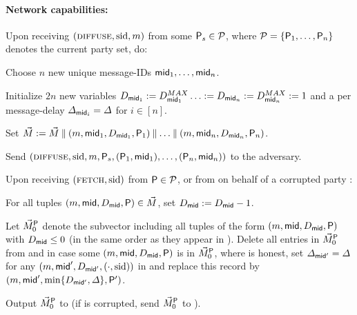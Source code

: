 \begin{cccFunctionality}
      \paragraph{Network capabilities:}
      \begin{cccItemize}[nosep]
            \item Upon receiving $(\textsc{diffuse}, \mathrm{sid}, m)$ from some
            $\mathsf{P}_s \in \mathcal{P}$, where $\mathcal{P} = \{ \mathsf{P}_1, \ldots, \mathsf{P}_n \}$ denotes the current party set, do:
            \begin{cccEnum}[nosep]
                  \item Choose $n$ new unique message-IDs $\mathsf{mid}_1, \ldots, \mathsf{mid}_n$.
                  \item Initialize $2n$ new variables $D_{\mathsf{mid}_1} := D^{MAX}_{\mathsf{mid}_1} \ldots := D_{\mathsf{mid}_n} := D^{MAX}_{\mathsf{mid}_n} := 1$ and a per message-delay $\varDelta_{\mathsf{mid}_i} = \varDelta$ for $i \in [n]$.
                  \item Set  $\vec{M} := \vec{M} \mathbin\Vert (m, \mathsf{mid}_1, D_{\mathsf{mid}_1}, \mathsf{P}_1) \mathbin\Vert \ldots \mathbin\Vert (m, \mathsf{mid}_n, D_{\mathsf{mid}_n}, \mathsf{P}_n)$.
                  \item Send $(\textsc{diffuse}, \mathrm{sid}, m, \mathsf{P}_s, (\mathsf{P}_1, \mathsf{mid}_1), \ldots ,(\mathsf{P}_n, \mathsf{mid}_n))$ to the adversary.
            \end{cccEnum}

            \item Upon receiving $(\textsc{fetch}, \mathrm{sid})$ from $\mathsf{P} \in \mathcal{P}$, or from \adv on behalf of a corrupted party \party:
            \begin{cccEnum}[nosep]
                  \item For all tuples $(m, \mathsf{mid}, D_\mathsf{mid}, \mathsf{P}) \in \vec{M}$, set $D_\mathsf{mid} := D_\mathsf{mid} - 1$.
                  \item Let $\vec{M}^\mathsf{P}_0$ denote the subvector \vecM including all tuples of the form $(m, \mathsf{mid}, D_\mathsf{mid}, \mathsf{P})$ with $D_\mathsf{mid} \le 0$ (in the same order as they appear in \vecM).
                  Delete all entries in $\vec{M}^\mathsf{P}_0$ from \vecM and in case some $(m, \mathsf{mid}, D_\mathsf{mid}, \mathsf{P})$ is in
                  $\vec{M}^\mathsf{P}_0$, where \party is honest, set $\varDelta_{\mathsf{mid}'} = \varDelta$ for any $(m, \mathsf{mid}', D_{\mathsf{mid}'}, (\cdot, \mathrm{sid}))$ in \vecM and replace this record by $(m, \mathsf{mid}', \min \{ D_{\mathsf{mid}'}, \varDelta \}, \mathsf{P}')$.
                  \item Output $\vec{M}^\mathsf{P}_0$ to \party (if \party is corrupted, send $\vec{M}^\mathsf{P}_0$ to \adv).
            \end{cccEnum}
      \end{cccItemize}


\end{cccFunctionality}

